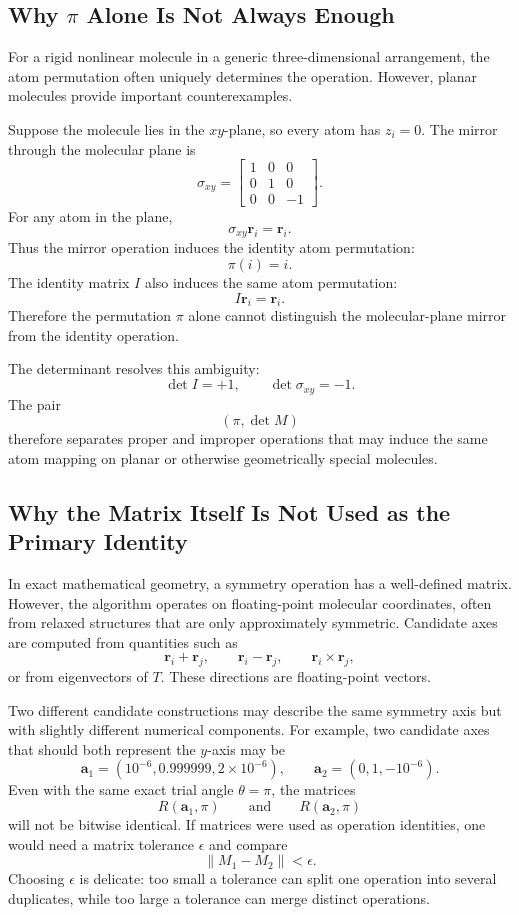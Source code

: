 \documentclass[11pt]{article}
\begin{document}
\subsection{Why \(\pi\) Alone Is Not Always Enough}

For a rigid nonlinear molecule in a generic three-dimensional arrangement, the
atom permutation often uniquely determines the operation.  However, planar
molecules provide important counterexamples.

Suppose the molecule lies in the \(xy\)-plane, so every atom has \(z_i=0\).  The
mirror through the molecular plane is
\[
    \sigma_{xy}
    =
    \begin{bmatrix}
    1 & 0 & 0\\
    0 & 1 & 0\\
    0 & 0 & -1
    \end{bmatrix}.
\]
For any atom in the plane,
\[
    \sigma_{xy}\mathbf r_i=\mathbf r_i.
\]
Thus the mirror operation induces the identity atom permutation:
\[
    \pi(i)=i.
\]
The identity matrix \(I\) also induces the same atom permutation:
\[
    I\mathbf r_i=\mathbf r_i.
\]
Therefore the permutation \(\pi\) alone cannot distinguish the molecular-plane
mirror from the identity operation.

The determinant resolves this ambiguity:
\[
    \det I = +1,
    \qquad
    \det \sigma_{xy}=-1.
\]
The pair
\[
    (\pi,\det M)
\]
therefore separates proper and improper operations that may induce the same
atom mapping on planar or otherwise geometrically special molecules.

\subsection{Why the Matrix Itself Is Not Used as the Primary Identity}

In exact mathematical geometry, a symmetry operation has a well-defined matrix.
However, the algorithm operates on floating-point molecular coordinates, often
from relaxed structures that are only approximately symmetric.  Candidate axes
are computed from quantities such as
\[
    \mathbf r_i+\mathbf r_j,\qquad
    \mathbf r_i-\mathbf r_j,\qquad
    \mathbf r_i\times\mathbf r_j,
\]
or from eigenvectors of \(T\).  These directions are floating-point vectors.

Two different candidate constructions may describe the same symmetry axis but
with slightly different numerical components.  For example, two candidate axes
that should both represent the \(y\)-axis may be
\[
    \mathbf a_1=(10^{-6},0.999999,2\times10^{-6}),
    \qquad
    \mathbf a_2=(0,1,-10^{-6}).
\]
Even with the same exact trial angle \(\theta=\pi\), the matrices
\[
    R(\mathbf a_1,\pi)
    \qquad\text{and}\qquad
    R(\mathbf a_2,\pi)
\]
will not be bitwise identical.  If matrices were used as operation identities,
one would need a matrix tolerance \(\epsilon\) and compare
\[
    \lVert M_1-M_2\rVert < \epsilon.
\]
Choosing \(\epsilon\) is delicate: too small a tolerance can split one operation
into several duplicates, while too large a tolerance can merge distinct
operations.
\end{document}
